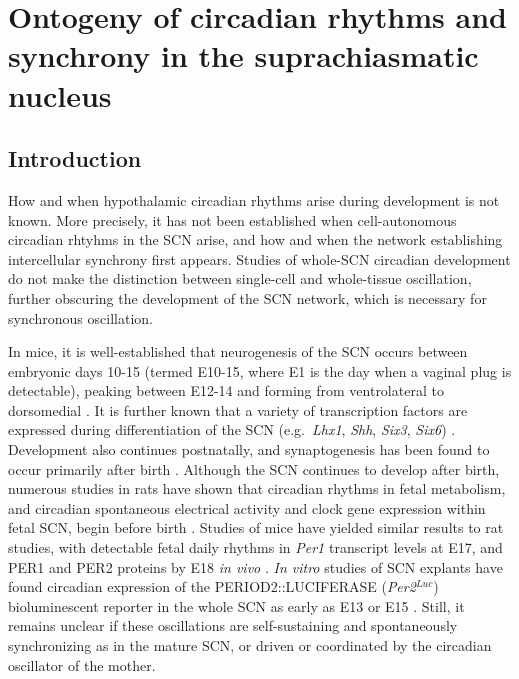 \chapter{Ontogeny of circadian rhythms and synchrony in the suprachiasmatic nucleus}

\section{Introduction}
How and when hypothalamic circadian rhythms arise during development is not known.
More precisely, it has not been established when cell-autonomous circadian rhtyhms in the SCN arise, and how and when the network establishing intercellular synchrony first appears.
Studies of whole-SCN circadian development do not make the distinction between single-cell and whole-tissue oscillation, further obscuring the development of the SCN network, which is necessary for synchronous oscillation.

In mice, it is well-established that neurogenesis of the SCN occurs between embryonic days 10-15 (termed E10-15, where E1 is the day when a vaginal plug is detectable), peaking between E12-14 and forming from ventrolateral to dorsomedial \cite{Shimada1973,  Kabrita2008, Shimogori2010}.
It is further known that a variety of transcription factors are expressed during differentiation of the SCN (e.g.\ \textit{Lhx1}, \textit{Shh}, \textit{Six3}, \textit{Six6}) \cite{Shimogori2010, VanDunk2011, Clark2013, Bedont2014}.
Development also continues postnatally, and synaptogenesis has been found to occur primarily after birth \cite{Moore1989, Shimogori2010}.
Although the SCN continues to develop after birth, numerous studies in rats have shown that circadian rhythms in fetal metabolism, and circadian spontaneous electrical activity and clock gene expression within fetal SCN, begin before birth \cite{reppert1983maternal, reppert1984suprachiasmatic, Shibata1987, Sladek2004, Kovacikova2006, Houdek2014}.
Studies of mice have yielded similar results to rat studies, with detectable fetal daily rhythms in \textit{Per1} transcript levels at E17, and PER1 and PER2 proteins by E18 \textit{in vivo} \cite{Shimomura2001, Ansari2009}.
\textit{In vitro} studies of SCN explants have found circadian expression of the PERIOD2::LUCIFERASE (\textit{Per2}$^{Luc}$) bioluminescent reporter in the whole SCN as early as E13 \cite{Landgraf2015} or E15 \cite{Wreschnig2014}.
Still, it remains unclear if these oscillations are self-sustaining and spontaneously synchronizing as in the mature SCN, or driven or coordinated by the circadian oscillator of the mother.

